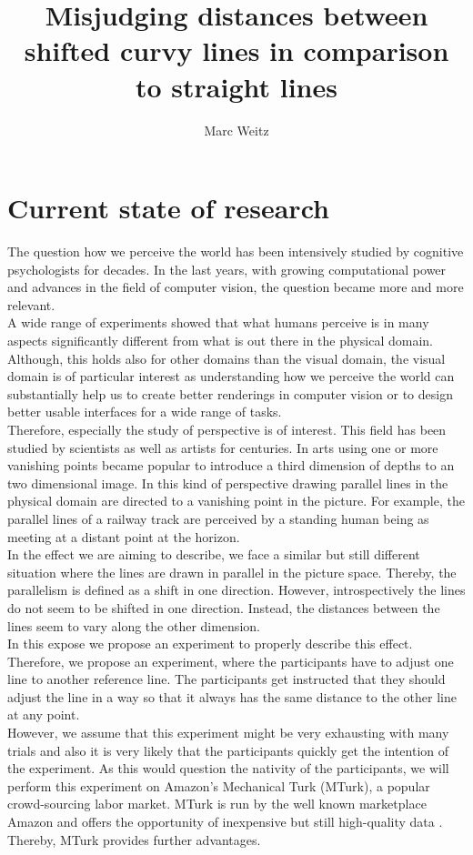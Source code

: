 \documentclass[a4paper, doc, draftall]{apa6}
\title{Misjudging distances between shifted curvy lines in comparison to straight lines}
\author{Marc Weitz}
\affiliation{Department of Psychology\\University of Tuebingen}
\begin{document}
\maketitle


\section{Current state of research}

The question how we perceive the world has been intensively studied by cognitive psychologists for decades. In the last years, with growing computational power and advances in the field of computer vision, the question became more and more relevant.\\
A wide range of experiments showed that what humans perceive is in many aspects significantly different from what is out there in the physical domain. Although, this holds also for other domains than the visual domain, the visual domain is of particular interest as understanding how we perceive the world can substantially help us to create better renderings in computer vision or to design better usable interfaces for a wide range of tasks.\\
Therefore, especially the study of perspective is of interest. This field has been studied by scientists as well as artists for centuries. In arts using one or more vanishing points became popular to introduce a third dimension of depths to an two dimensional image. In this kind of perspective drawing parallel lines in the physical domain are directed to a vanishing point in the picture. For example, the parallel lines of a railway track are perceived by a standing human being as meeting at a distant point at the horizon.\\
In the effect we are aiming to describe, we face a similar but still different situation where the lines are drawn in parallel in the picture space. Thereby, the parallelism is defined as a shift in one direction. However, introspectively the lines do not seem to be shifted in one direction. Instead, the distances between the lines seem to vary along the other dimension.\\
In this expose we propose an experiment to properly describe this effect. Therefore, we propose an experiment, where the participants have to adjust one line to another reference line. The participants get instructed that they should adjust the line in a way so that it always has the same distance to the other line at any point.\\
However, we assume that this experiment might be very exhausting with many trials and also it is very likely that the participants quickly get the intention of the experiment. As this would question the nativity of the participants, we will perform this experiment on Amazon's Mechanical Turk (MTurk), a popular crowd-sourcing labor market. MTurk is run by the well known marketplace Amazon and offers the opportunity of inexpensive but still high-quality data \parencite{buhrmeister2011}. Thereby, MTurk provides further advantages. \\
\end{document}
